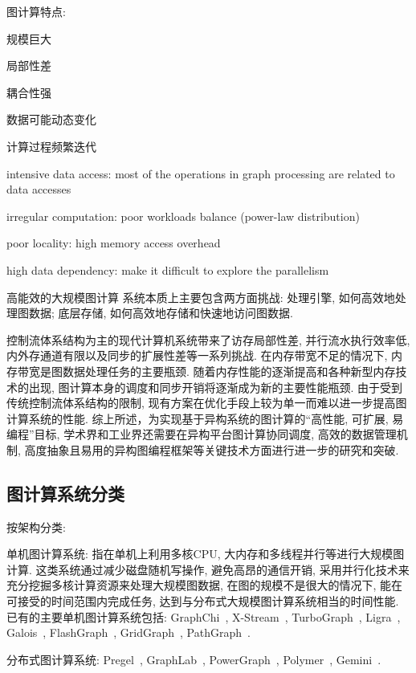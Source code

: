 \documentclass[UTF8,12pt,a4paper]{article}
\begin{document}
图计算特点:
\begin{compactitem}
  \item 规模巨大
  \item 局部性差
  \item 耦合性强
  \item 数据可能动态变化
  \item 计算过程频繁迭代
  \item intensive data access:
  most of the operations in graph processing are related to data accesses
  \item irregular computation: poor workloads balance (power-law distribution)
  \item poor locality: high memory access overhead
  \item high data dependency: make it difficult to explore the parallelism 
\end{compactitem}

高能效的大规模图计算
系统本质上主要包含两方面挑战:
处理引擎, 如何高效地处理图数据;
底层存储, 如何高效地存储和快速地访问图数据.

控制流体系结构为主的现代计算机系统带来了访存局部性差, 并行流水执行效率低,
内外存通道有限以及同步的扩展性差等一系列挑战.
在内存带宽不足的情况下, 内存带宽是图数据处理任务的主要瓶颈.
随着内存性能的逐渐提高和各种新型内存技术的出现,
图计算本身的调度和同步开销将逐渐成为新的主要性能瓶颈.
由于受到传统控制流体系结构的限制,
现有方案在优化手段上较为单一而难以进一步提高图计算系统的性能.
综上所述，为实现基于异构系统的图计算的``高性能, 可扩展, 易编程''目标,
学术界和工业界还需要在异构平台图计算协同调度, 高效的数据管理机制,
高度抽象且易用的异构图编程框架等关键技术方面进行进一步的研究和突破.

\subsection{图计算系统分类}
按架构分类:
\begin{compactitem}
  \item 单机图计算系统: 指在单机上利用多核CPU, 大内存和多线程并行等进行大规模图计算.
  这类系统通过减少磁盘随机写操作, 避免高昂的通信开销,
  采用并行化技术来充分挖掘多核计算资源来处理大规模图数据,
  在图的规模不是很大的情况下, 能在可接受的时间范围内完成任务,
  达到与分布式大规模图计算系统相当的时间性能.
  已有的主要单机图计算系统包括: GraphChi~\cite{DBLP:conf/osdi/KyrolaBG12},
  X-Stream~\cite{DBLP:conf/sosp/RoyMZ13},
  TurboGraph~\cite{DBLP:conf/kdd/HanLPL0KY13},
  Ligra~\cite{DBLP:conf/ppopp/ShunB13},
  Galois~\cite{DBLP:conf/sosp/NguyenLP13},
  FlashGraph~\cite{DBLP:conf/fast/ZhengMBVPS15},
  GridGraph~\cite{DBLP:conf/usenix/ZhuHC15},
  PathGraph~\cite{DBLP:journals/tpds/YuanXLJ16}.
  \item 分布式图计算系统: Pregel~\cite{DBLP:conf/sigmod/MalewiczABDHLC10},
  GraphLab~\cite{DBLP:journals/pvldb/LowGKBGH12},
  PowerGraph~\cite{DBLP:conf/osdi/GonzalezLGBG12},
  Polymer~\cite{DBLP:conf/ppopp/ZhangCC15},
  Gemini~\cite{DBLP:conf/osdi/ZhuCZM16}.
\end{compactitem}
\end{document}
